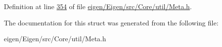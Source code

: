 Definition at line \hyperlink{eigen_2_eigen_2src_2_core_2util_2_meta_8h_source_l00354}{354} of file \hyperlink{eigen_2_eigen_2src_2_core_2util_2_meta_8h_source}{eigen/\+Eigen/src/\+Core/util/\+Meta.\+h}.



The documentation for this struct was generated from the following file\+:\begin{DoxyCompactItemize}
\item 
eigen/\+Eigen/src/\+Core/util/\+Meta.\+h\end{DoxyCompactItemize}
